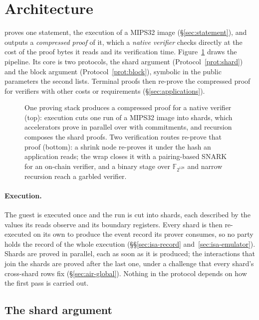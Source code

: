\section{Architecture}
\label{sec:architecture}
\label{sec:overview}
\label{sec:argument}

\Ziren{} proves one statement, the execution of a MIPS32 image (\S\ref{sec:statement}), and outputs a \emph{compressed proof} of it, which a \emph{native verifier} checks directly at the cost of the proof bytes it reads and its verification time. Figure~\ref{fig:architecture} draws the pipeline. Its core is two protocols, the shard argument (Protocol~\ref{prot:shard}) and the block argument (Protocol~\ref{prot:block}), symbolic in the public parameters the second lists. Terminal proofs then re-prove the compressed proof for verifiers with other costs or requirements (\S\ref{sec:applications}).

\begin{figure}[t]
\centering
\resizebox{\textwidth}{!}{}
\caption{One proving stack produces a compressed proof for a native verifier (top): execution cuts one run of a MIPS32 image into shards, which accelerators prove in parallel over \KB{} with \Poseidon{} commitments, and recursion composes the shard proofs. Two verification routes re-prove that proof (bottom): a shrink node re-proves it under the hash an application reads; the wrap closes it with a pairing-based SNARK for an on-chain verifier, and a binary stage over $\mathbb F_{2^{128}}$ and narrow recursion reach a garbled verifier.}
\label{fig:architecture}
\end{figure}

\paragraph{Execution.}\label{sec:arch-execution} The guest is executed once and the run is cut into shards, each described by the values its reads observe and its boundary registers. Every shard is then re-executed on its own to produce the event record its prover consumes, so no party holds the record of the whole execution (\S\S\ref{sec:isa-record} and~\ref{sec:isa-emulator}). Shards are proved in parallel, each as soon as it is produced; the interactions that join the shards are proved after the last one, under a challenge that every shard's cross-shard rows fix (\S\ref{sec:air-global}). Nothing in the protocol depends on how the first pass is carried out.

\subsection{The shard argument}
\label{sec:arch-shard}
\label{sec:argument-components}
\label{sec:argument-shard}

